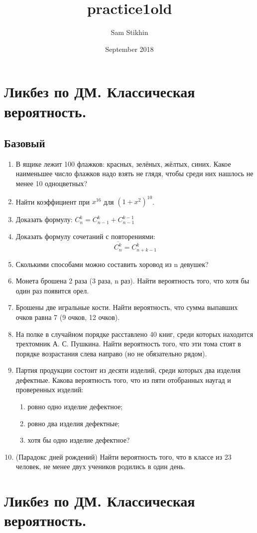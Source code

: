 \documentclass[a4paper, 14pt]{extarticle}
\title{practice1old}
\author{Sam Stikhin}
\date{September 2018}
\begin{document}
\section{Ликбез по ДМ. Классическая вероятность.}
\subsection{Базовый}
\begin{enumerate}
\item В ящике лежит 100 флажков: красных, зелёных,
жёлтых, синих. Какое наименьшее
число флажков надо взять не глядя, чтобы
среди них нашлось не менее 10 одноцветных?
\item Найти коэффициент при $x^{16}$ для $(1 + x^2)^{10}$.
\item Доказать формулу: $C_{n}^k = C_{n-1}^k + C_{n-1}^{k-1}$
\item Доказать формулу сочетаний с повторениями: 
$$\overline{C_n^k} = C_{n+k-1}^k$$
\item Сколькими способами можно составить хоровод из n девушек?
\item Монета брошена 2 раза (3 раза, n раз). Найти вероятность того,
	что хотя бы один раз появится орел.
\item Брошены две игральные кости. Найти вероятность, 
что сумма выпавших очков равна 7 (9 очков, 12 очков).


\item  На полке в случайном порядке расставлено
40 книг, среди которых находится трехтомник А. С. 
Пушкина. Найти вероятность того, что эти тома стоят в 
порядке возрастания слева направо (но не обязательно рядом).

\item Партия продукции состоит из десяти изделий, среди которых два
изделия дефектные. Какова вероятность того, что из пяти отобранных
наугад и проверенных изделий:\begin{enumerate}
	\item ровно одно изделие дефектное;
	\item ровно два изделия дефектные;
	\item хотя бы одно изделие дефектное?
\end{enumerate}

\item (Парадокс дней рождений) Найти вероятность того, что в классе из 23 человек, не менее двух учеников родились в один день.
\end{enumerate}
\newpage

\section{Ликбез по ДМ. Классическая вероятность.}
\end{document}
